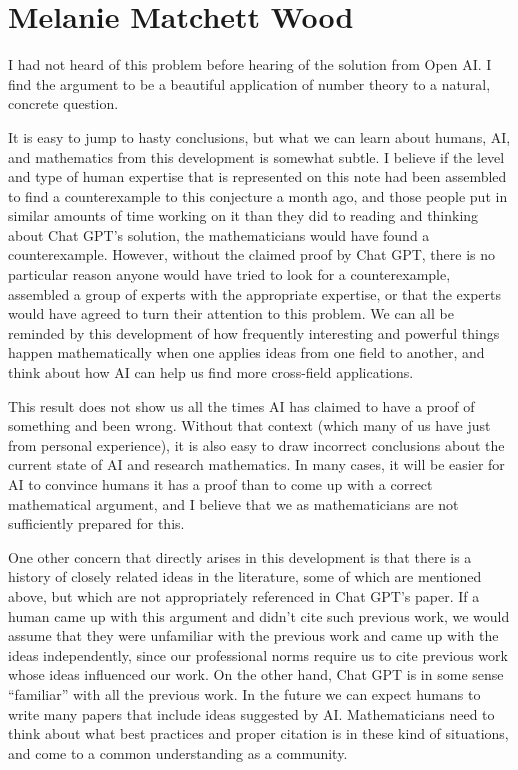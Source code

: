 \documentclass[11pt,reqno]{amsart}
\numberwithin{equation}{section}
\theoremstyle{definition}
\theoremstyle{remark}
\begin{document}
\section{Melanie Matchett Wood}

I had not heard of this problem before hearing of the solution from Open AI.  I find the argument to be a beautiful application of number theory to a natural, concrete question.

It is easy to jump to hasty conclusions, but what we can learn about humans, AI, and mathematics from this development is somewhat subtle.  I believe if the level and type of human expertise that is represented on this note had been assembled to find a counterexample to this conjecture a month ago, and those people put in similar amounts of time working on it than they did to reading and thinking about Chat GPT’s solution, the mathematicians would have found a counterexample.  However, without the claimed proof by Chat GPT, there is no particular reason anyone would have tried to look for a counterexample, assembled a group of experts with the appropriate expertise, or that the experts would have agreed to turn their attention to this problem.  We can all be reminded by this development of how frequently interesting and powerful things happen mathematically when one applies ideas from one field to another, and think about how AI can help us find more cross-field applications.

This result does not show us all the times AI has claimed to have a proof of something and been wrong.  Without that context (which many of us have just from personal experience), it is also easy to draw incorrect conclusions about the current state of AI and research mathematics.  In many cases, it will be  easier for AI to convince humans it has a proof than to come up with a correct mathematical argument, and I believe that we as mathematicians are not sufficiently prepared for this.  

One other concern that directly arises in this development is that there is a history of closely related ideas in the literature, some of which are mentioned above, but which are not appropriately referenced  in Chat GPT’s paper.  If a human came up with this argument and didn’t cite such previous work, we would assume that they were unfamiliar with the previous work and came up with the ideas independently, since our professional norms require us to cite previous work whose ideas influenced our work.  On the other hand, Chat GPT is in some sense “familiar” with all the previous work.  In the future we can expect humans to write many papers that include ideas suggested by AI.  Mathematicians need to think about what best practices and proper citation is in these kind of situations, and come to a common understanding as a community.  
\end{document}
